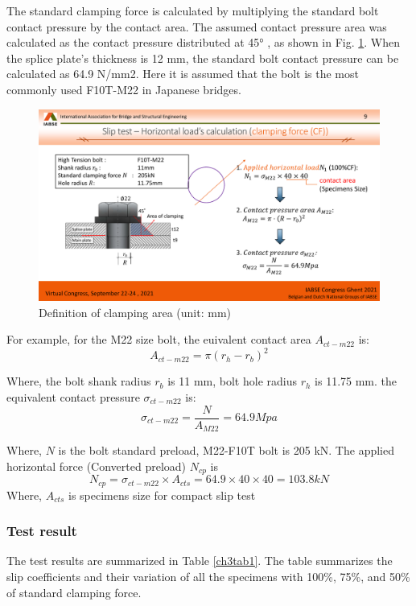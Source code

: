 The standard clamping force is calculated by multiplying the standard bolt contact pressure by the contact area. The assumed contact pressure area was calculated as the contact pressure distributed at 45° \cite{rotscher1927maschinenelemente}, as shown in Fig. \ref{ch3fig8}. When the splice plate's thickness is 12 mm, the standard bolt contact pressure can be calculated as 64.9 N/mm2. Here it is assumed that the bolt is the most commonly used F10T-M22 in Japanese bridges.


\begin{figure}[htbp]
\centering
\includegraphics[width=0.65\linewidth]{imgs/ch3/fig8.pdf}
\caption{Definition of clamping area (unit: mm)}
\label{ch3fig8}  
\end{figure}

For example, for the M22 size bolt, the euivalent contact area $A_{ct-m22}$ is:
\begin{equation*}
    A_{ct-m22} = \pi (r_h-r_b)^2
\end{equation*}

Where, the  bolt shank radius $r_b$ is 11 mm, bolt hole radius $r_h$ is 11.75 mm.
the equivalent contact pressure $\sigma_{ct-m22}$ is:
\begin{equation*}
    \sigma_{ct-m22} = \frac{N}{A_{M22}} = 64.9 Mpa
\end{equation*}

Where, $N$ is the bolt standard preload, M22-F10T bolt is 205 kN.
The applied horizontal force (Converted preload) $N_{cp}$ is 
\begin{equation*}
    N_{cp} = \sigma_{ct-m22} \times A_{cts} =64.9 \times 40 \times 40 = 103.8 kN
\end{equation*}
Where, $A_{cts}$ is specimens size for compact slip test


\subsubsection{Test result}

The test results are summarized in Table \ref{ch3tab1}. The table summarizes the slip coefficients and their variation of all the specimens with 100\%, 75\%, and 50\% of standard clamping force.


